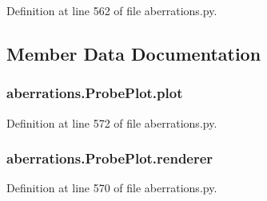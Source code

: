 Definition at line 562 of file aberrations.\-py.



\subsection{Member Data Documentation}
\hypertarget{classaberrations_1_1_probe_plot_aeee4b28e67fa521e038e1ff128125417}{
\subsubsection[{plot}]{\setlength{\rightskip}{0pt plus 5cm}aberrations.\-Probe\-Plot.\-plot}}\label{classaberrations_1_1_probe_plot_aeee4b28e67fa521e038e1ff128125417}


Definition at line 572 of file aberrations.\-py.

\hypertarget{classaberrations_1_1_probe_plot_a6543bf7e879a2bcbb57e59f09aeb2bd9}{
\subsubsection[{renderer}]{\setlength{\rightskip}{0pt plus 5cm}aberrations.\-Probe\-Plot.\-renderer}}\label{classaberrations_1_1_probe_plot_a6543bf7e879a2bcbb57e59f09aeb2bd9}


Definition at line 570 of file aberrations.\-py.

